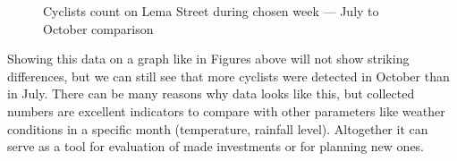 \begin{figure}[H]
    \centering
    \caption{Cyclists count on Lema Street during chosen week --- July to October comparison}
    \label{fig:lemaWeek}
\end{figure}

Showing this data on a graph like in Figures above will not show striking differences, but we can still see that more cyclists were detected in October than in July. There can be many reasons why data looks like this, but collected numbers are excellent indicators to compare with other parameters like weather conditions in a specific month (temperature, rainfall level). Altogether it can serve as a tool for evaluation of made investments or for planning new ones.